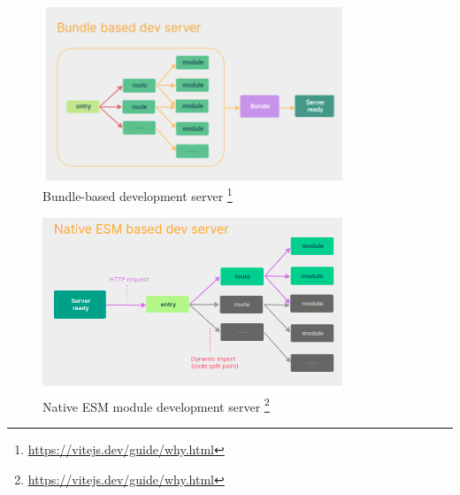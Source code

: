 \documentclass[
]{beamer}
\begin{document}
\begin{frame}
  \begin{figure}
    \includegraphics[width=0.8\textwidth,height=\textheight,keepaspectratio]{images/bundle_dev_server.png}
    \caption{Bundle-based development server
    \footnote{\url{https://vitejs.dev/guide/why.html}}
  }
  \end{figure}
\end{frame}

\begin{frame}
  \begin{figure}
    \includegraphics[width=0.8\textwidth,height=\textheight,keepaspectratio]{images/native_esm_dev_server.png}
    \caption{Native ESM module development server
    \footnote{\url{https://vitejs.dev/guide/why.html}}
  }
  \end{figure}
\end{frame}

\makeoutro
\end{document}
